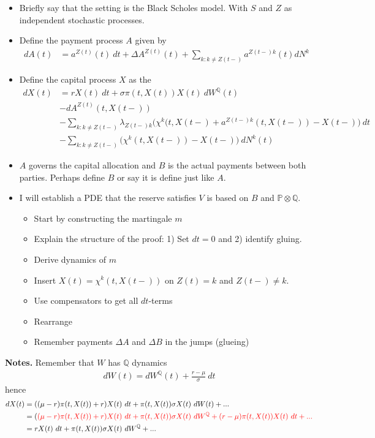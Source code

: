 \documentclass[a4paper,12pt,openany]{book}
\providecommand{\tightlist}{%
 \setlength{\itemsep}{0pt}\setlength{\parskip}{0pt}}
\begin{document}
\begin{itemize}
\tightlist
\item
  Briefly say that the setting is the Black Scholes model. With \(S\) and \(Z\) as independent stochastic processes.
\item
  Define the payment process \(A\) given by
  \begin{align*}
    dA(t)&=a^{Z(t)}(t)\ dt+\Delta A^{Z(t)}(t)+\sum_{k:k\ne Z(t-)}a^{Z(t-)k}(t)dN^k
    \end{align*}
\item
  Define the capital process \(X\) as the
  \begin{align*}
    dX(t)&=rX(t)\ dt+\sigma \pi(t,X(t))X(t)\ dW^{\mathbb Q}(t)\\
    &-dA^{Z(t)}(t,X(t-))\\
    &-\sum_{k:k\ne Z(t-)}\lambda_{Z(t-)k}\Big(\chi^k(t,X(t-)+a^{Z(t-)k}(t,X(t-))-X(t-)\Big)\ dt\\
    &-\sum_{k:k\ne Z(t-)}\Big(\chi^k(t,X(t-))-X(t-)\Big)\ dN^k(t)
    \end{align*}
\item
  \(A\) governs the capital allocation and \(B\) is the actual payments between both parties. Perhaps define \(B\) or say it is define just like \(A\).
\item
  I will establish a PDE that the reserve satisfies \(V\) is based on \(B\) and \(\mathbb P\otimes \mathbb Q\).

  \begin{itemize}
  \tightlist
  \item
    Start by constructing the martingale \(m\)
  \item
    Explain the structure of the proof: 1) Set \(dt=0\) and 2) identify gluing.
  \item
    Derive dynamics of \(m\)
  \item
    Insert \(X(t)=\chi^k(t,X(t-))\) on \(Z(t)=k\) and \(Z(t-)\ne k\).
  \item
    Use compensators to get all \(dt\)-terms
  \item
    Rearrange
  \item
    Remember payments \(\Delta A\) and \(\Delta B\) in the jumps (glueing)
  \end{itemize}
\end{itemize}

\textbf{Notes.} Remember that \(W\) has \(\mathbb Q\) dynamics
\begin{align*}
dW(t)=dW^\mathbb Q(t)+\frac{r-\mu}{\sigma}\ dt
\end{align*}
hence
\begin{align*}
dX(t)&=((\mu-r)\pi(t,X(t))+r)X(t)\ dt+\pi(t,X(t))\sigma X(t)\ dW(t)+...\\
&=(\color{red}{(\mu-r)\pi(t,X(t))}+r)X(t)\ dt+\pi(t,X(t))\sigma X(t)\ dW^\mathbb Q+\color{red}{(r-\mu)\pi(t,X(t))}X(t)\ dt+...\\
&=rX(t)\ dt+\pi(t,X(t))\sigma X(t)\ dW^\mathbb Q+...
\end{align*}
\end{document}
